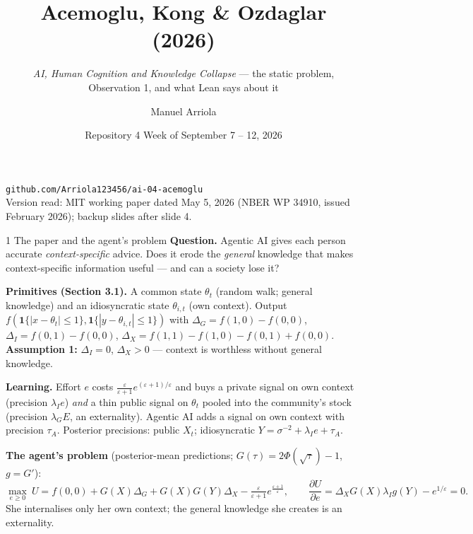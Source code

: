 \documentclass[aspectratio=169,11pt]{beamer}
\title{Acemoglu, Kong \& Ozdaglar (2026)}
\subtitle{\emph{AI, Human Cognition and Knowledge Collapse} --- the static problem, Observation 1, and what Lean says about it}
\author{Manuel Arriola}
\date{Repository 4 \textperiodcentered{} Week of September 7 -- 12, 2026}
\newcommand{\ind}{\mathbf 1}
\begin{document}
\begin{frame}[plain]
  \titlepage
  \begin{center}\small
    \texttt{github.com/Arriola123456/ai-04-acemoglu}\\[2pt]
    \footnotesize Version read: MIT working paper dated May 5, 2026 (NBER WP 34910, issued February 2026); backup slides after slide 4.
  \end{center}
\end{frame}

\begin{frame}{1 \textperiodcentered{} The paper and the agent's problem}
  \footnotesize
  \textbf{Question.} Agentic AI gives each person accurate \emph{context-specific} advice. Does it erode the
  \emph{general} knowledge that makes context-specific information useful --- and can a society lose it?

  \smallskip
  \textbf{Primitives (Section 3.1).} A common state $\theta_t$ (random walk; general knowledge) and an
  idiosyncratic state $\theta_{i,t}$ (own context). Output $f(\ind\{|x-\theta_t|\le 1\},\ind\{|y-\theta_{i,t}|\le 1\})$
  with $\Delta_G=f(1,0)-f(0,0)$, $\Delta_I=f(0,1)-f(0,0)$, $\Delta_X=f(1,1)-f(1,0)-f(0,1)+f(0,0)$.
  \textbf{Assumption 1:} $\Delta_I=0$, $\Delta_X>0$ --- context is worthless without general knowledge.

  \smallskip
  \textbf{Learning.} Effort $e$ costs $\tfrac{\varepsilon}{\varepsilon+1}e^{(\varepsilon+1)/\varepsilon}$ and buys a
  private signal on own context (precision $\lambda_I e$) \emph{and} a thin public signal on $\theta_t$ pooled
  into the community's stock (precision $\lambda_G E$, an externality). Agentic AI adds a signal on own context
  with precision $\tau_A$. Posterior precisions: public $X_t$; idiosyncratic $Y=\sigma^{-2}+\lambda_I e+\tau_A$.

  \textbf{The agent's problem} (posterior-mean predictions; $G(\tau)=2\Phi(\sqrt\tau)-1$, $g=G'$):
  \vspace{-4pt}
  \[
    \max_{e\ge 0}\ U=f(0,0)+G(X)\Delta_G+G(X)G(Y)\Delta_X-\tfrac{\varepsilon}{\varepsilon+1}e^{\frac{\varepsilon+1}{\varepsilon}},
    \qquad
    \frac{\partial U}{\partial e}=\Delta_X G(X)\lambda_I g(Y)-e^{1/\varepsilon}=0 .
  \]
  \vspace{-6pt}
  She internalises only her own context; the general knowledge she creates is an externality.
\end{frame}
\end{document}
